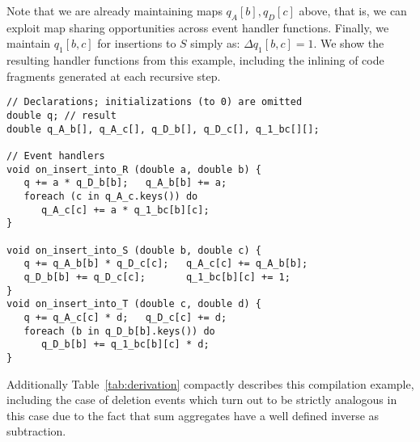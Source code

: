 \noindent Note that we are already maintaining maps $q_A[b], q_D[c]$ above, that
is, we can exploit map sharing opportunities across event handler functions.
Finally, we maintain $q_1[b,c]$ for insertions to $S$ simply as:
$\Delta q_1[b,c] = 1$. We show the resulting handler functions from this example,
including the inlining of code fragments generated at each recursive step.

\vspace{-1mm}
\begin{verbatim}
// Declarations; initializations (to 0) are omitted
double q; // result
double q_A_b[], q_A_c[], q_D_b[], q_D_c[], q_1_bc[][];

// Event handlers
void on_insert_into_R (double a, double b) {
   q += a * q_D_b[b];   q_A_b[b] += a;
   foreach (c in q_A_c.keys()) do
      q_A_c[c] += a * q_1_bc[b][c];
}

void on_insert_into_S (double b, double c) {
   q += q_A_b[b] * q_D_c[c];   q_A_c[c] += q_A_b[b];
   q_D_b[b] += q_D_c[c];       q_1_bc[b][c] += 1;
}
void on_insert_into_T (double c, double d) {
   q += q_A_c[c] * d;   q_D_c[c] += d;
   foreach (b in q_D_b[b].keys()) do
      q_D_b[b] += q_1_bc[b][c] * d;
}
\end{verbatim}
\vspace{-1mm}

Additionally Table~\ref{tab:derivation} compactly describes this compilation
example, including the case of deletion events which turn out to be strictly analogous in
this case due to the fact that sum aggregates have a well defined inverse as
subtraction.



